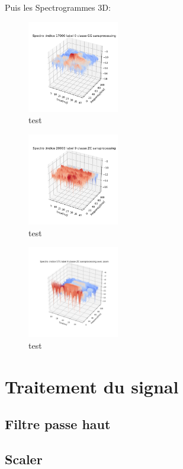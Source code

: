 Puis les Spectrogrammes 3D:

\begin{figure}[!h]
\centering
\includegraphics[width=4cm]{./images/indice17000Spectro3Dlabel0classeGGsansprocessingsanszoom.png}
\caption{test}
\end{figure}


\begin{figure}[!h]
\centering
\includegraphics[width=4cm]{./images/indice20000Spectro3Dlabel9classeZCsansprocessingsanszoom.png}
\caption{test}
\end{figure}

\begin{figure}[!h]
\centering
\includegraphics[width=4cm]{./images/indice571Spectro3Dlabel9classeZCsansprocessingaveczoom.png}
\caption{test}
\end{figure}
\section{Traitement du signal}

\subsection{Filtre passe haut}

\subsection{Scaler}

